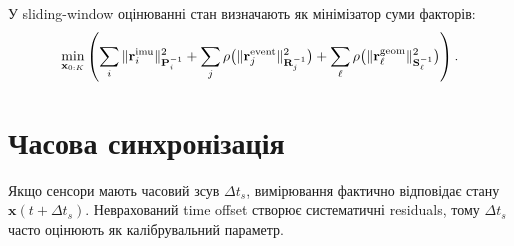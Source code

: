 У sliding-window оцінюванні стан визначають як мінімізатор суми факторів:
\begin{equation}
 \min_{\mathbf{x}_{0:K}} \left(
 \sum_i \|\mathbf{r}^{\rm imu}_i\|^2_{\mathbf{P}_i^{-1}}+
 \sum_j \rho\bigl(\|\mathbf{r}^{\rm event}_j\|^2_{\mathbf{R}_j^{-1}}\bigr)+
 \sum_\ell \rho\bigl(\|\mathbf{r}^{\rm geom}_\ell\|^2_{\mathbf{S}_\ell^{-1}}\bigr)
 \right).
\end{equation}

\section{Часова синхронізація}

Якщо сенсори мають часовий зсув $\Delta t_s$, вимірювання фактично відповідає стану $\mathbf{x}(t+\Delta t_s)$. Неврахований time offset створює систематичні residuals, тому $\Delta t_s$ часто оцінюють як калібрувальний параметр.
